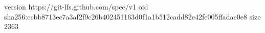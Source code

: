 version https://git-lfs.github.com/spec/v1
oid sha256:ccbb8713ec7a3af2f9c26b402451163d0f1a1b512cadd82e42fe005ffadae0e8
size 2363
